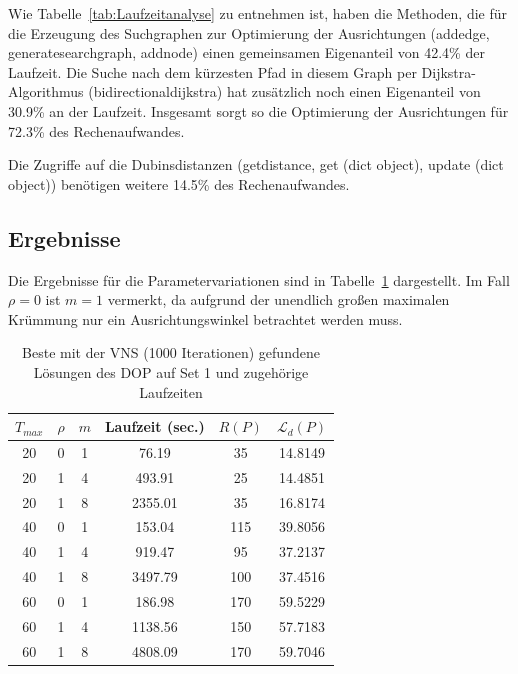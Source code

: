 \documentclass[12pt,a4paper,twoside]{article}
\theoremstyle{definition}
\numberwithin{equation}{section}
\begin{document}
Wie Tabelle~\ref{tab:Laufzeitanalyse} zu entnehmen ist, haben die Methoden, die für die Erzeugung des Suchgraphen zur Optimierung der Ausrichtungen (add\textunderscore edge, generate\textunderscore search\textunderscore graph, add\textunderscore node) einen gemeinsamen Eigenanteil von 42.4\% der Laufzeit. Die Suche nach dem kürzesten Pfad in diesem Graph per Dijkstra-Algorithmus (bidirectional\textunderscore dijkstra) hat zusätzlich noch einen Eigenanteil von 30.9\% an der Laufzeit. Insgesamt sorgt so die Optimierung der Ausrichtungen für 72.3\% des Rechenaufwandes.

Die Zugriffe auf die Dubinsdistanzen (get\textunderscore distance, get (dict object), update (dict object)) benötigen weitere 14.5\% des Rechenaufwandes.

\subsection{Ergebnisse}\label{subsection:results}
Die Ergebnisse für die Parametervariationen sind in Tabelle~\ref{tab:Results_Parametervariation} dargestellt.
Im Fall $\rho = 0$ ist $m = 1$ vermerkt, da aufgrund der unendlich großen maximalen Krümmung nur ein Ausrichtungswinkel betrachtet werden muss.

\begin{table}[h]
	\centering
	\begin{tabular}{ |c|c|c|c|c|c| }
		\hline
		$T_{max}$ & $\rho$ & $m$ &  Laufzeit (sec.) & $R(P)$ & $\mathcal{L}_d(P)$ \\
		\hline  
		20 & 0 & 1  & 76.19
		 & 35 & 14.8149\\
		20 & 1 & 4  & 493.91
		 & 25 & 14.4851 \\
		20 & 1 & 8  & 2355.01
		& 35 & 16.8174\\ 
		40 & 0 & 1  & 153.04
		 & 115 & 39.8056
		 \\
		40 & 1 & 4 & 919.47
		 & 95 & 37.2137
		 \\
		40 & 1 & 8  & 3497.79
		& 100 & 37.4516
		\\
		60 & 0 & 1  & 186.98
		 & 170 & 59.5229
		 \\
		60 & 1 & 4  & 1138.56
		& 150 & 57.7183
		\\
		60 & 1 & 8  & 4808.09
		& 170 & 59.7046
		\\
		\hline
	\end{tabular}
	\caption{Beste mit der VNS (1000 Iterationen) gefundene Lösungen des DOP auf Set 1 und zugehörige Laufzeiten}
	\label{tab:Results_Parametervariation}
\end{table}
\end{document}
